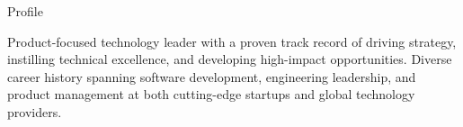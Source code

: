 \documentclass{resume} %
\begin{document}
\begin{rSection}{Profile}

    Product-focused technology leader with a proven track record of driving strategy, instilling technical excellence, and developing high-impact opportunities. Diverse career history spanning software development, engineering leadership, and product management at both cutting-edge startups and global technology providers.

\end{rSection}

\end{document}
